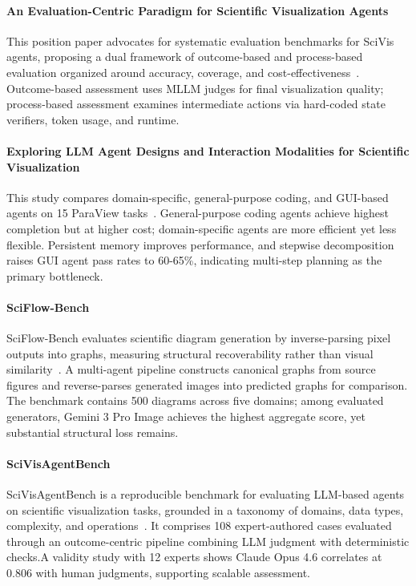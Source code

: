 \paragraph{An Evaluation-Centric Paradigm for Scientific Visualization Agents}
This position paper advocates for systematic evaluation benchmarks for SciVis agents, proposing a dual framework of outcome-based and process-based evaluation organized around accuracy, coverage, and cost-effectiveness~\cite{avg250915160}. Outcome-based assessment uses MLLM judges for final visualization quality; process-based assessment examines intermediate actions via hard-coded state verifiers, token usage, and runtime. 

\paragraph{Exploring LLM Agent Designs and Interaction Modalities for Scientific Visualization}
This study compares domain-specific, general-purpose coding, and GUI-based agents on 15 ParaView tasks~\cite{avg260427996}. General-purpose coding agents achieve highest completion but at higher cost; domain-specific agents are more efficient yet less flexible. Persistent memory improves performance, and stepwise decomposition raises GUI agent pass rates to 60-65\%, indicating multi-step planning as the primary bottleneck.

\paragraph{SciFlow-Bench}
SciFlow-Bench evaluates scientific diagram generation by inverse-parsing pixel outputs into graphs, measuring structural recoverability rather than visual similarity~\cite{avg260209809}. A multi-agent pipeline constructs canonical graphs from source figures and reverse-parses generated images into predicted graphs for comparison. The benchmark contains 500 diagrams across five domains; among evaluated generators, Gemini 3 Pro Image achieves the highest aggregate score, yet substantial structural loss remains.

\paragraph{SciVisAgentBench}
SciVisAgentBench is a reproducible benchmark for evaluating LLM-based agents on scientific visualization tasks, grounded in a taxonomy of domains, data types, complexity, and operations~\cite{avg260329139}. It comprises 108 expert-authored cases evaluated through an outcome-centric pipeline combining LLM judgment with deterministic checks.A validity study with 12 experts shows Claude Opus 4.6 correlates at 0.806 with human judgments, supporting scalable assessment.

